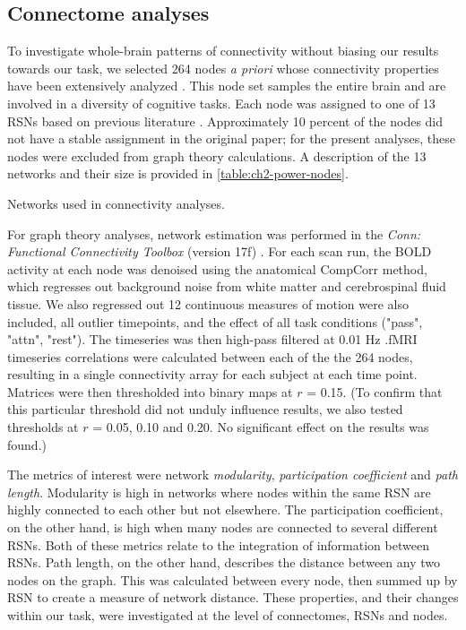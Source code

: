 \subsection{Connectome analyses}

To investigate whole-brain patterns of connectivity without biasing our results towards our task, we selected 264 nodes \textit{a priori} whose connectivity properties have been extensively analyzed \citep{Power2011}. This node set samples the entire brain and are involved in a diversity of cognitive tasks. Each node was assigned to one of 13 RSNs based on previous literature \citep{Power2013}. Approximately 10 percent of the nodes did not have a stable assignment in the original paper; for the present analyses, these nodes were excluded from graph theory calculations. A description of the 13 networks and their size is provided in \ref{table:ch2-power-nodes}. 

\begin{table}
	\renewcommand{\tabcolsep}{0.09cm}
	\centering
	
	\caption{Networks used in connectivity analyses.}
	\label{table:ch2-power-nodes}
\end{table}

For graph theory analyses, network estimation was performed in the \textit{Conn: Functional Connectivity Toolbox} (version 17f) \citep{Nieto-castanon}. For each scan run, the BOLD activity at each node was denoised using the anatomical CompCorr method, which regresses out background noise from white matter and cerebrospinal fluid tissue. We also regressed out 12 continuous measures of motion were also included, all outlier timepoints, and the effect of all task conditions ("pass", "attn", "rest"). The timeseries was then high-pass filtered at 0.01 Hz .fMRI timeseries correlations were calculated between each of the the 264 nodes, resulting in a single connectivity array for each subject at each time point. Matrices were then thresholded into binary maps at $r$ = 0.15. (To confirm that this particular threshold did not unduly influence results, we also tested thresholds at $r$ = 0.05, 0.10 and 0.20. No significant effect on the results was found.)

The metrics of interest were network \textit{modularity}, \textit{participation coefficient} and \textit{path length}. Modularity is high in networks where nodes within the same RSN are highly connected to each other but not elsewhere. The participation coefficient, on the other hand, is high when many nodes are connected to several different RSNs. Both of these metrics relate to the integration of information between RSNs. Path length, on the other hand, describes the distance between any two nodes on the graph. This was calculated between every node, then summed up by RSN to create a measure of network distance. These properties, and their changes within our task, were investigated at the level of connectomes, RSNs and nodes. 


